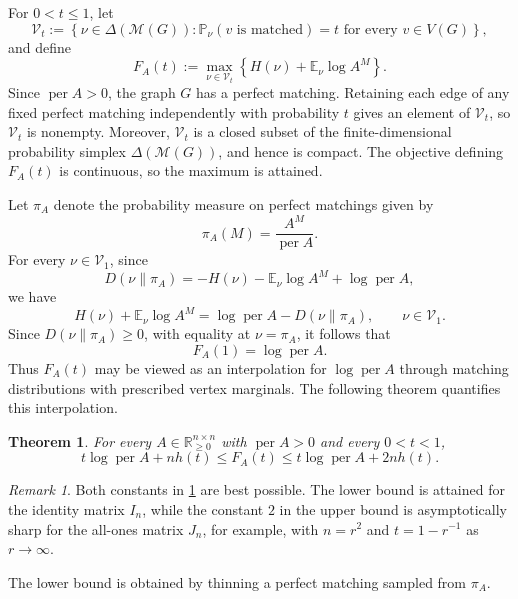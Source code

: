 \documentclass[11pt,reqno,letterpaper]{amsart}
\numberwithin{equation}{section}
\newtheorem{theorem}{Theorem}[section]
\theoremstyle{definition}
\theoremstyle{remark}
\newtheorem{remark}[remark]{Remark}
\newcommand{\mc}{\mathcal}
\newcommand{\R}{\mathbb R}
\newcommand{\E}{\mathbb E}
\newcommand{\PP}{\mathbb P}
\DeclareMathOperator{\per}{per}
\begin{document}
For $0<t\leq1$, let
\[
  \mathcal V_t
  :=
  \left\{
    \nu\in\Delta(\mathcal M(G)):
    \PP_\nu(v\text{ is matched})=t
    \text{ for every }v\in V(G)
  \right\},
\]
and define
\begin{equation*}
  F_A(t)
  :=
  \max_{\nu\in\mathcal V_t}
  \left\{
    H(\nu)+\E_\nu\log A^M
  \right\}.
\end{equation*}
Since $\per A>0$, the graph $G$ has a perfect matching. Retaining
each edge of any fixed perfect matching independently with probability
$t$ gives an element of $\mathcal V_t$, so $\mathcal V_t$ is nonempty.
Moreover, $\mathcal V_t$ is a closed subset of the finite-dimensional
probability simplex $\Delta(\mathcal M(G))$, and hence is compact.
The objective defining $F_A(t)$ is continuous, so the maximum is
attained.

 Let $\pi_A$ denote the probability measure on perfect
matchings given by
\begin{equation*}
  \pi_A(M)=\frac{A^M}{\per A}.
\end{equation*}
For every $\nu\in\mathcal V_1$, since
\[
  D(\nu\|\pi_A)
  =-H(\nu)-\E_\nu\log A^M+\log\per A,
\]
we have
\[
  H(\nu)+\E_\nu\log A^M
  =
  \log\per A-D(\nu\|\pi_A), \qquad \nu \in \mc V_1.
\]
Since $D(\nu\|\pi_A)\geq0$, with equality at $\nu=\pi_A$, it follows that
\[
  F_A(1)=\log\per A.
\]
Thus $F_A(t)$ may be viewed as an interpolation for $\log \per A$ through 
matching distributions with prescribed vertex marginals. The following theorem quantifies this interpolation.

\begin{theorem}\label{thm:entropy}
For every $A\in\R_{\geq0}^{n\times n}$ with $\per A>0$ and every
$0<t<1$,
\begin{equation*}
  t\log\per A+nh(t)
  \leq F_A(t)
  \leq t\log\per A+2nh(t).
\end{equation*}
\end{theorem}

\begin{remark}\label{rem:entropy-sharpness}
Both constants in \cref{thm:entropy} are best possible. The lower
bound is attained for the identity matrix $I_n$, while the constant
$2$ in the upper bound is asymptotically sharp for the all-ones
matrix $J_n$, for example, with $n=r^2$ and $t=1-r^{-1}$ as $r\to\infty$. 
\end{remark}

The lower bound is obtained by thinning a perfect matching sampled
from $\pi_A$.
\end{document}
